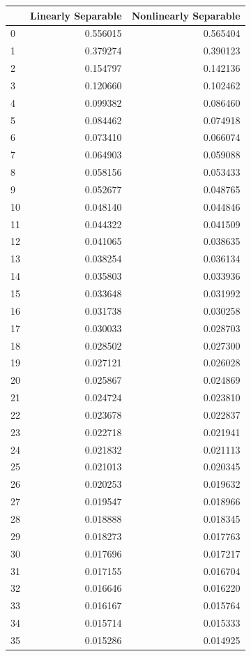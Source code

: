 \begin{tabular}{lrr}
\toprule
 & Linearly Separable & Nonlinearly Separable \\
\midrule
0 & 0.556015 & 0.565404 \\
1 & 0.379274 & 0.390123 \\
2 & 0.154797 & 0.142136 \\
3 & 0.120660 & 0.102462 \\
4 & 0.099382 & 0.086460 \\
5 & 0.084462 & 0.074918 \\
6 & 0.073410 & 0.066074 \\
7 & 0.064903 & 0.059088 \\
8 & 0.058156 & 0.053433 \\
9 & 0.052677 & 0.048765 \\
10 & 0.048140 & 0.044846 \\
11 & 0.044322 & 0.041509 \\
12 & 0.041065 & 0.038635 \\
13 & 0.038254 & 0.036134 \\
14 & 0.035803 & 0.033936 \\
15 & 0.033648 & 0.031992 \\
16 & 0.031738 & 0.030258 \\
17 & 0.030033 & 0.028703 \\
18 & 0.028502 & 0.027300 \\
19 & 0.027121 & 0.026028 \\
20 & 0.025867 & 0.024869 \\
21 & 0.024724 & 0.023810 \\
22 & 0.023678 & 0.022837 \\
23 & 0.022718 & 0.021941 \\
24 & 0.021832 & 0.021113 \\
25 & 0.021013 & 0.020345 \\
26 & 0.020253 & 0.019632 \\
27 & 0.019547 & 0.018966 \\
28 & 0.018888 & 0.018345 \\
29 & 0.018273 & 0.017763 \\
30 & 0.017696 & 0.017217 \\
31 & 0.017155 & 0.016704 \\
32 & 0.016646 & 0.016220 \\
33 & 0.016167 & 0.015764 \\
34 & 0.015714 & 0.015333 \\
35 & 0.015286 & 0.014925 \\

\end{tabular}
